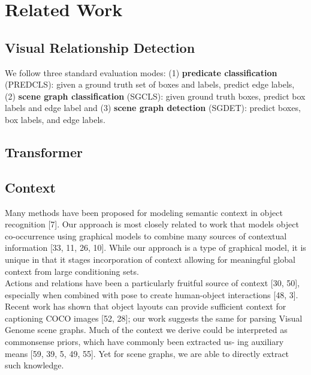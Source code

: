 \chapter{Related Work}
\label{chap:relatedwork}


\section{Visual Relationship Detection}

We follow three standard evaluation modes: (1) \textbf{predicate classification} (PREDCLS): given a ground truth set of boxes and labels, predict edge labels, (2) \textbf{scene graph classification} (SGCLS): given ground truth boxes, predict box labels and edge label and (3) \textbf{scene graph detection} (SGDET): predict boxes, box labels, and edge labels.

\section{Transformer}

\section{Context}
Many methods have been proposed for modeling semantic context in object recognition [7]. Our approach is most closely related to work that models object co-occurrence using graphical models to combine many sources of contextual information [33, 11, 26, 10]. While our approach is a type of graphical model, it is unique in that it stages incorporation of context allowing for meaningful global context from large conditioning sets.\\
Actions and relations have been a particularly fruitful source of context [30, 50], especially when combined with pose to create human-object interactions [48, 3]. Recent work has shown that object layouts can provide sufficient context for captioning COCO images [52, 28]; our work suggests the same for parsing Visual Genome scene graphs. Much of the context we derive could be interpreted as commonsense priors, which have commonly been extracted us- ing auxiliary means [59, 39, 5, 49, 55]. Yet for scene graphs, we are able to directly extract such knowledge.